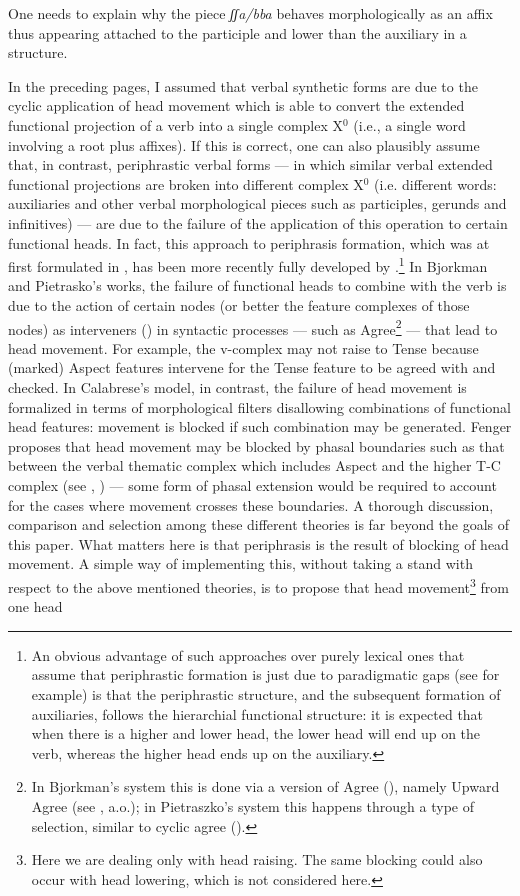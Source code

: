 \documentclass[output=paper]{langscibook}
\begin{document}
One needs to explain why the piece \textit{ʃʃa/bba} behaves morphologically as an affix thus appearing attached  to the participle and lower than the auxiliary in a structure.

In the preceding pages, I assumed that verbal synthetic forms are due to the cyclic application of head movement which is able to convert the extended functional projection of a verb into a single complex X$^0$ (i.e., a single word involving a root plus affixes). If this is correct, one can also plausibly assume that, in contrast, periphrastic verbal forms — in which similar verbal extended functional projections are broken into different complex X$^0$ (i.e. different words: auxiliaries and other verbal morphological pieces such as participles, gerunds and infinitives) — are due to the failure of the application of this operation to certain functional heads. In fact, this approach to periphrasis formation, which was at first formulated in \cite{embick2000a}, has been more recently fully developed by \cite{bjorkman2011a, pietraszko2016a, fenger2020a, calabrese2019a}.\footnote{An obvious advantage of such approaches over purely lexical ones that assume that periphrastic formation is just due to paradigmatic gaps (see \cite{kiparsky2004a} for example) is that the periphrastic structure, and the subsequent formation of auxiliaries, follows the hierarchial functional structure: it is expected that when there is a higher and lower head, the lower head will end up on the verb, whereas the higher head ends up on the auxiliary.}  In Bjorkman and Pietrasko’s works, the failure of functional heads to combine with the verb is due to the action of certain nodes (or better the feature complexes of those nodes) as interveners (\cite{rizzi1990a}) in syntactic processes — such as Agree\footnote{In Bjorkman’s system this is done via a version of Agree (\cite{chomsky2000a, chomsky2001}), namely Upward Agree (see \cite{merchant2011a}, a.o.); in Pietraszko’s system this happens through a type of selection, similar to cyclic agree (\cite{bejar2009a}).}  — that lead to head movement. For example, the v-complex may not raise to Tense because (marked) Aspect features intervene for the Tense feature to be agreed with and checked. In Calabrese’s model, in contrast, the failure of head movement is formalized in terms of morphological filters disallowing combinations of functional head features: movement is blocked if such combination may be generated. Fenger proposes that head movement may be blocked by phasal boundaries such as that between the verbal thematic complex which includes Aspect and the higher T-C complex (see \cite{bo2014a}, \cite{wurmbrand2017verb}) — some form of phasal extension would be required to account for the cases where movement crosses these boundaries.  A thorough discussion, comparison and selection among these different theories is far beyond the goals of this paper.  What matters here is that periphrasis is the result of blocking of head movement. A simple way of implementing this, without taking a stand with respect to the above mentioned theories, is to propose that head movement\footnote{Here we are dealing only with head raising. The same blocking could also occur with head lowering, which is not considered here.}  from one head 
\end{document}
